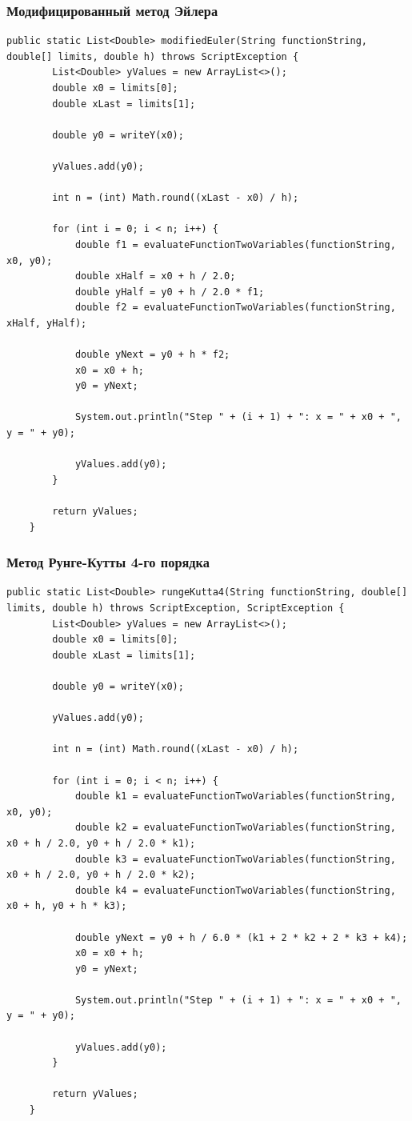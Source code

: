 \documentclass[12pt]{article}
\begin{document}
\subsubsection{Модифицированный метод Эйлера}

\begin{verbatim}
public static List<Double> modifiedEuler(String functionString, double[] limits, double h) throws ScriptException {
        List<Double> yValues = new ArrayList<>();
        double x0 = limits[0];
        double xLast = limits[1];

        double y0 = writeY(x0);

        yValues.add(y0);

        int n = (int) Math.round((xLast - x0) / h);

        for (int i = 0; i < n; i++) {
            double f1 = evaluateFunctionTwoVariables(functionString, x0, y0);
            double xHalf = x0 + h / 2.0;
            double yHalf = y0 + h / 2.0 * f1;
            double f2 = evaluateFunctionTwoVariables(functionString, xHalf, yHalf);

            double yNext = y0 + h * f2;
            x0 = x0 + h;
            y0 = yNext;

            System.out.println("Step " + (i + 1) + ": x = " + x0 + ", y = " + y0);

            yValues.add(y0);
        }

        return yValues;
    }
\end{verbatim}

\subsubsection{Метод Рунге-Кутты 4-го порядка}

\begin{verbatim}
public static List<Double> rungeKutta4(String functionString, double[] limits, double h) throws ScriptException, ScriptException {
        List<Double> yValues = new ArrayList<>();
        double x0 = limits[0];
        double xLast = limits[1];

        double y0 = writeY(x0);

        yValues.add(y0);

        int n = (int) Math.round((xLast - x0) / h);

        for (int i = 0; i < n; i++) {
            double k1 = evaluateFunctionTwoVariables(functionString, x0, y0);
            double k2 = evaluateFunctionTwoVariables(functionString, x0 + h / 2.0, y0 + h / 2.0 * k1);
            double k3 = evaluateFunctionTwoVariables(functionString, x0 + h / 2.0, y0 + h / 2.0 * k2);
            double k4 = evaluateFunctionTwoVariables(functionString, x0 + h, y0 + h * k3);

            double yNext = y0 + h / 6.0 * (k1 + 2 * k2 + 2 * k3 + k4);
            x0 = x0 + h;
            y0 = yNext;

            System.out.println("Step " + (i + 1) + ": x = " + x0 + ", y = " + y0);

            yValues.add(y0);
        }

        return yValues;
    }
\end{verbatim}
\end{document}
